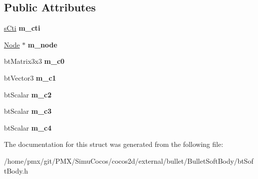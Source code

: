 \subsection*{Public Attributes}
\begin{DoxyCompactItemize}
\item 
\mbox{\label{structbtSoftBody_1_1RContact_a16d3320b0ec49e9bad6b9589c04cfe50}} 
\hyperlink{structbtSoftBody_1_1sCti}{s\+Cti} {\bfseries m\+\_\+cti}
\item 
\mbox{\label{structbtSoftBody_1_1RContact_a91e08172ca7278478dabda95881dffcb}} 
\hyperlink{structbtSoftBody_1_1Node}{Node} $\ast$ {\bfseries m\+\_\+node}
\item 
\mbox{\label{structbtSoftBody_1_1RContact_a9ac99e80f862a19452fc2b451c979b9d}} 
bt\+Matrix3x3 {\bfseries m\+\_\+c0}
\item 
\mbox{\label{structbtSoftBody_1_1RContact_a6eadf65f297f841a8d065d5cc071334b}} 
bt\+Vector3 {\bfseries m\+\_\+c1}
\item 
\mbox{\label{structbtSoftBody_1_1RContact_a10f62432bbbb1ed4f2003ced24a3e7a7}} 
bt\+Scalar {\bfseries m\+\_\+c2}
\item 
\mbox{\label{structbtSoftBody_1_1RContact_ab22964c6cd93a7b8cf12f4f5b4d0556e}} 
bt\+Scalar {\bfseries m\+\_\+c3}
\item 
\mbox{\label{structbtSoftBody_1_1RContact_a5da2bf761efb065f9951826f9fe796b1}} 
bt\+Scalar {\bfseries m\+\_\+c4}
\end{DoxyCompactItemize}


The documentation for this struct was generated from the following file\+:\begin{DoxyCompactItemize}
\item 
/home/pmx/git/\+P\+M\+X/\+Simu\+Cocos/cocos2d/external/bullet/\+Bullet\+Soft\+Body/bt\+Soft\+Body.\+h\end{DoxyCompactItemize}
